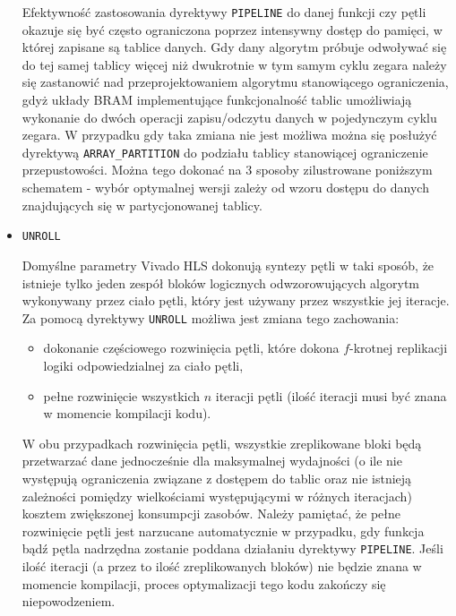 \begin{itemize}
Efektywność zastosowania dyrektywy \texttt{PIPELINE} do danej funkcji czy pętli okazuje się być często ograniczona poprzez intensywny dostęp do pamięci, w której zapisane są tablice danych. Gdy dany algorytm próbuje odwoływać się do tej samej tablicy więcej niż dwukrotnie w tym samym cyklu zegara należy się zastanowić nad przeprojektowaniem algorytmu stanowiącego ograniczenia, gdyż układy BRAM implementujące funkcjonalność tablic umożliwiają wykonanie do dwóch operacji zapisu/odczytu danych w pojedynczym cyklu zegara. W przypadku gdy taka zmiana nie jest możliwa można się posłużyć dyrektywą \texttt{ARRAY\_PARTITION} do podziału tablicy stanowiącej ograniczenie przepustowości. Można tego dokonać na 3 sposoby zilustrowane poniższym schematem - wybór optymalnej wersji zależy od wzoru dostępu do danych znajdujących się w partycjonowanej tablicy.

\item \texttt{UNROLL}

Domyślne parametry Vivado HLS dokonują syntezy pętli w taki sposób, że istnieje tylko jeden zespół bloków logicznych odwzorowujących algorytm wykonywany przez ciało pętli, który jest używany przez wszystkie jej iteracje. Za pomocą dyrektywy \texttt{UNROLL} możliwa jest zmiana tego zachowania:
\begin{itemize}
\item dokonanie częściowego rozwinięcia pętli, które dokona $f$-krotnej replikacji logiki odpowiedzialnej za ciało pętli,
\item pełne rozwinięcie wszystkich $n$ iteracji pętli (ilość iteracji musi być znana w momencie kompilacji kodu).  
\end{itemize}
W obu przypadkach rozwinięcia pętli, wszystkie zreplikowane bloki będą przetwarzać dane jednocześnie dla maksymalnej wydajności (o ile nie występują ograniczenia związane z dostępem do tablic oraz nie istnieją zależności pomiędzy wielkościami występującymi w różnych iteracjach) kosztem zwiększonej konsumpcji zasobów. Należy pamiętać, że pełne rozwinięcie pętli jest narzucane automatycznie w przypadku, gdy funkcja bądź pętla nadrzędna zostanie poddana działaniu dyrektywy \texttt{PIPELINE}. Jeśli ilość iteracji (a przez to ilość zreplikowanych bloków) nie będzie znana w momencie kompilacji, proces optymalizacji tego kodu zakończy się niepowodzeniem.


\end{itemize}
